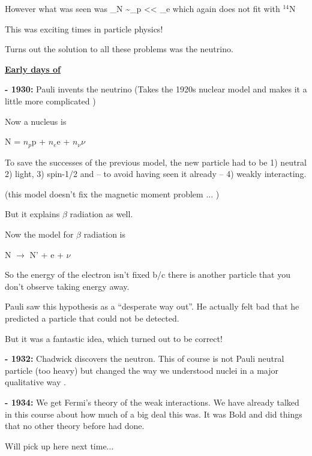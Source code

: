 {However what was seen was 
\be
\mu_N \sim \mu_p << \mu_e \hspace{0.2in} \textrm{which again does not fit with $^{14}$N}
\ee

This was exciting times in particle physics! 

Turns out the solution to all these problems was the neutrino.

\textbf{\underline{Early days of \nus}}

\textbf{- 1930:} Pauli invents the neutrino (Takes the 1920s nuclear model and makes it a little more complicated )

Now a nucleus is

\begin{center}
N = $n_p$p + $n_e$e + $n_\nu \nu$
\end{center}

To save the successes of the previous model, the new particle had to be 1) neutral 2) light, 3) spin-1/2 and -- to avoid having seen it already -- 4) weakly interacting. 

(this model doesn't fix the magnetic moment problem ... )

But it explains $\beta$ radiation as well.

Now the model for $\beta$ radiation is

\begin{center}
N $\rightarrow$ N' + e + $\nu$
\end{center}

So the energy of the electron isn't fixed b/c there is another particle that you don't observe taking energy away.

Pauli saw this hypothesis as a ``desperate way out''.
He actually felt bad that he predicted a particle that could not be detected. 

But it was a fantastic idea, which turned out to be correct! 


\textbf{- 1932:} Chadwick  discovers the neutron. This of course is not Pauli neutral particle (too heavy) but changed the way we understood nuclei in a major qualitative way . 

\textbf{- 1934:} We get Fermi's theory of the weak interactions.  We have already talked in this course about how much of a big deal this was. 
It was Bold and did things that no other theory before had done. 

Will pick up here next time...





}



